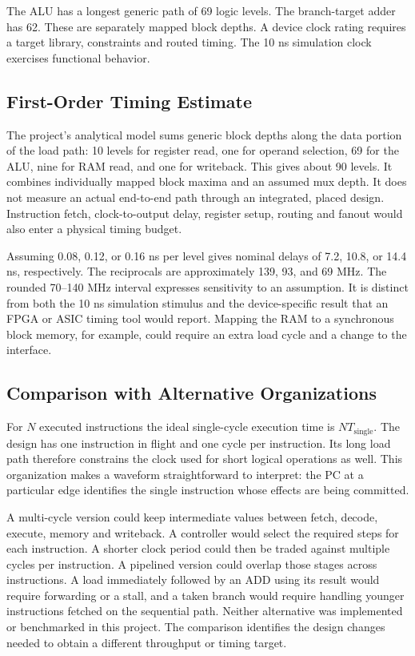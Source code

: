 \documentclass[conference,letterpaper]{IEEEtran}
\begin{document}
The ALU has a longest generic path of 69 logic levels. The branch-target adder has 62. These are separately mapped block depths. A device clock rating requires a target library, constraints and routed timing. The 10 ns simulation clock exercises functional behavior.

\subsection{First-Order Timing Estimate}
The project's analytical model sums generic block depths along the data portion of the load path: 10 levels for register read, one for operand selection, 69 for the ALU, nine for RAM read, and one for writeback. This gives about 90 levels. It combines individually mapped block maxima and an assumed mux depth. It does not measure an actual end-to-end path through an integrated, placed design. Instruction fetch, clock-to-output delay, register setup, routing and fanout would also enter a physical timing budget.

Assuming 0.08, 0.12, or 0.16 ns per level gives nominal delays of 7.2, 10.8, or 14.4 ns, respectively. The reciprocals are approximately 139, 93, and 69 MHz. The rounded 70--140 MHz interval expresses sensitivity to an assumption. It is distinct from both the 10 ns simulation stimulus and the device-specific result that an FPGA or ASIC timing tool would report. Mapping the RAM to a synchronous block memory, for example, could require an extra load cycle and a change to the interface.

\subsection{Comparison with Alternative Organizations}
For $N$ executed instructions the ideal single-cycle execution time is $NT_\mathrm{single}$. The design has one instruction in flight and one cycle per instruction. Its long load path therefore constrains the clock used for short logical operations as well. This organization makes a waveform straightforward to interpret: the PC at a particular edge identifies the single instruction whose effects are being committed.

A multi-cycle version could keep intermediate values between fetch, decode, execute, memory and writeback. A controller would select the required steps for each instruction. A shorter clock period could then be traded against multiple cycles per instruction. A pipelined version could overlap those stages across instructions. A load immediately followed by an ADD using its result would require forwarding or a stall, and a taken branch would require handling younger instructions fetched on the sequential path. Neither alternative was implemented or benchmarked in this project. The comparison identifies the design changes needed to obtain a different throughput or timing target.
\end{document}
